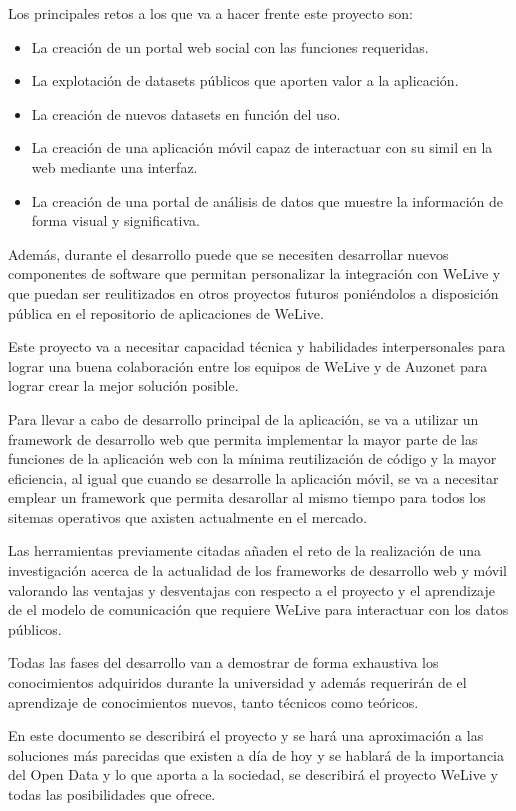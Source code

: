 \documentclass{DeustoFDP}
\begin{document}
Los principales retos a los que va a hacer frente este proyecto son:

\begin{itemize}
  \item La creación de un portal web social con las funciones requeridas.
  \item La explotación de datasets públicos que aporten valor a la aplicación.
  \item La creación de nuevos datasets en función del uso.
  \item La creación de una aplicación móvil capaz de interactuar con su simil en la web mediante una interfaz.
  \item La creación de una portal de análisis de datos que muestre la información de forma visual y significativa.
\end{itemize}

Además, durante el desarrollo puede que se necesiten desarrollar nuevos componentes de software que permitan personalizar la integración con WeLive y que puedan ser reulitizados en otros proyectos futuros poniéndolos a disposición pública en el repositorio de aplicaciones de WeLive.

Este proyecto va a necesitar capacidad técnica y habilidades interpersonales para lograr una buena colaboración entre los equipos de WeLive y de Auzonet para lograr crear la mejor solución posible.

Para llevar a cabo de desarrollo principal de la aplicación, se va a utilizar un framework de desarrollo web que permita implementar la mayor parte de las funciones de la aplicación web con la mínima reutilización de código y la mayor eficiencia, al igual que cuando se desarrolle la aplicación móvil, se va a necesitar emplear un framework que permita desarollar al mismo tiempo para todos los sitemas operativos que axisten actualmente en el mercado.

Las herramientas previamente citadas añaden el reto de la realización de una investigación acerca de la actualidad de los frameworks de desarrollo web y móvil valorando las ventajas y desventajas con respecto a el proyecto y el aprendizaje de el modelo de comunicación que requiere WeLive para interactuar con los datos públicos.

Todas las fases del desarrollo van a demostrar de forma exhaustiva los conocimientos adquiridos durante la universidad y además requerirán de el aprendizaje de conocimientos nuevos, tanto técnicos como teóricos.

En este documento se describirá el proyecto y se hará una aproximación a las soluciones más parecidas que existen a día de hoy y se hablará de la importancia del Open Data y lo que aporta a la sociedad, se describirá el proyecto WeLive y todas las posibilidades que ofrece.
\end{document}
